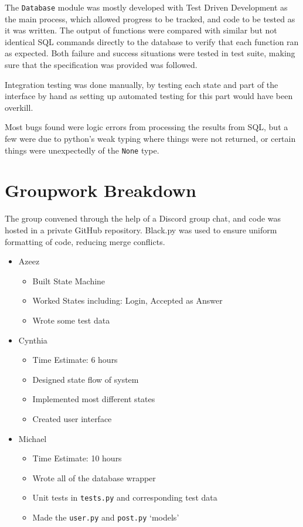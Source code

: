 \documentclass{article}
\begin{document}
The \verb|Database| module was mostly developed with Test Driven Development as the main process, which allowed progress to be tracked, and code to be tested as it was written. The output of functions were compared with similar but not identical SQL commands directly to the database to verify that each function ran as expected. Both failure and success situations were tested in test suite, making sure that the specification was provided was followed.

Integration testing was done manually, by testing each state and part of the interface by hand as setting up automated testing for this part would have been overkill.

Most bugs found were logic errors from processing the results from SQL, but a few were due to python's weak typing where things were not returned, or certain things were unexpectedly of the \verb|None| type.

\section{Groupwork Breakdown}

The group convened through the help of a Discord group chat, and code was hosted in a private GitHub repository. Black.py was used to ensure uniform formatting of code, reducing merge conflicts.

\begin{itemize}
    \item Azeez
          \begin{itemize}
              \item Built State Machine
              \item Worked States including: Login, Accepted as Answer
              \item Wrote some test data
          \end{itemize}
    \item Cynthia
          \begin{itemize}
              \item Time Estimate: 6 hours
              \item Designed state flow of system
              \item Implemented most different states
              \item Created user interface
          \end{itemize}
    \item Michael
          \begin{itemize}
              \item Time Estimate: 10 hours
              \item Wrote all of the database wrapper
              \item Unit tests in \verb|tests.py| and corresponding test data
              \item Made the \verb|user.py| and \verb|post.py| `models'
          \end{itemize}
\end{itemize}
\end{document}
